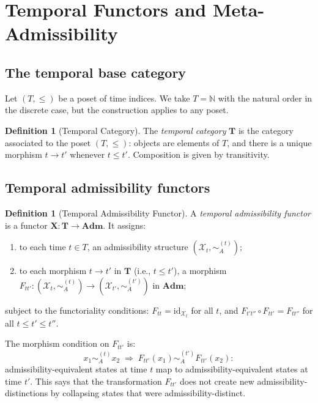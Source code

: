 \documentclass[11pt, a4paper]{article}
\theoremstyle{plain}
\theoremstyle{definition}
\newtheorem{definition}[theorem]{Definition}
\theoremstyle{remark}
\newcommand{\N}{\mathbb{N}}
\newcommand{\calX}{\mathcal{X}}
\newcommand{\simA}{\sim_{\!A}}
\newcommand{\Adm}{\mathbf{Adm}}
\newcommand{\id}{\mathrm{id}}
\begin{document}
\section{Temporal Functors and Meta-Admissibility}
\label{sec:temporal}

\subsection{The temporal base category}

Let $(T, \leq)$ be a poset of time indices. We take $T = \N$ with the natural
order in the discrete case, but the construction applies to any poset.

\begin{definition}[Temporal Category]
\label{def:temporal_cat}
The \emph{temporal category} $\mathbf{T}$ is the category associated to
the poset $(T, \leq)$: objects are elements of $T$, and there is a unique
morphism $t \to t'$ whenever $t \leq t'$. Composition is given by
transitivity.
\end{definition}

\subsection{Temporal admissibility functors}

\begin{definition}[Temporal Admissibility Functor]
\label{def:temporal}
A \emph{temporal admissibility functor} is a functor
$\mathbf{X}\colon \mathbf{T} \to \Adm$. It assigns:
\begin{enumerate}[noitemsep, label=(\roman*)]
  \item to each time $t \in T$, an admissibility structure
    $(\calX_t, \simA^{(t)})$;
  \item to each morphism $t \to t'$ in $\mathbf{T}$ (i.e., $t \leq t'$),
    a morphism $F_{tt'}\colon (\calX_t, \simA^{(t)}) \to (\calX_{t'},
    \simA^{(t')})$ in $\Adm$;
\end{enumerate}
subject to the functoriality conditions: $F_{tt} = \id_{\calX_t}$ for all
$t$, and $F_{t't''} \circ F_{tt'} = F_{tt''}$ for all $t \leq t' \leq t''$.
\end{definition}

The morphism condition on $F_{tt'}$ is:
\[
  x_1 \simA^{(t)} x_2 \;\Longrightarrow\; F_{tt'}(x_1) \simA^{(t')} F_{tt'}(x_2):
\]
admissibility-equivalent states at time $t$ map to admissibility-equivalent
states at time $t'$. This says that the transformation $F_{tt'}$ does not
create new admissibility-distinctions by collapsing states that were
admissibility-distinct.
\end{document}
